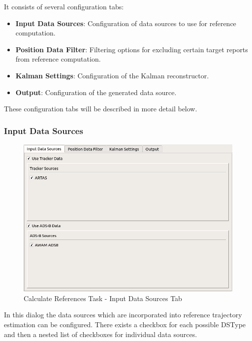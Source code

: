 It consists of several configuration tabs:

\begin{itemize}
    \item \textbf{Input Data Sources}: Configuration of data sources to use for reference computation.
    \item \textbf{Position Data Filter}: Filtering options for excluding certain target reports from reference computation.
    \item \textbf{Kalman Settings}: Configuration of the Kalman reconstructor.
    \item \textbf{Output}: Configuration of the generated data source. \\
\end{itemize}

These configuration tabs will be described in more detail below.

\subsubsection{Input Data Sources}

\begin{figure}[H]
    \center
      \includegraphics[frame,width=14cm]{figures/ui_task_references_tab_inputds.png}
    \caption{Calculate References Task - Input Data Sources Tab}
\end{figure}

In this dialog the data sources which are incorporated into reference trajectory estimation can be configured.
There exists a checkbox for each possible DSType and then a nested list of checkboxes for individual data sources. \\

